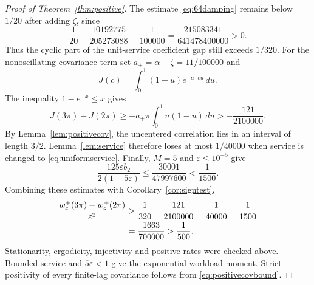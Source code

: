 \documentclass[11pt,reqno]{amsart}
\numberwithin{equation}{section}
\theoremstyle{plain}
\theoremstyle{definition}
\newcommand{\1}{\mathbf 1}
\newcommand{\eps}{\varepsilon}
\begin{document}
\begin{proof}[Proof of Theorem~\ref{thm:positive}]
The estimate \eqref{eq:64damping} remains below $1/20$ after adding $\zeta$, since
\[
 \frac1{20}-\frac{10192775}{205273088}-\frac1{100000}
 =\frac{215083341}{641478400000}>0.
\]
Thus the cyclic part of the unit-service coefficient gap still exceeds $1/320$. For the nonoscillating covariance term set $a_+=\alpha+\zeta=11/100000$ and
\[
 J(c)=\int_0^1(1-u)e^{-a_+cu}\,du.
\]
The inequality $1-e^{-x}\le x$ gives
\[
 J(3\pi)-J(2\pi)\ge-a_+\pi\int_0^1u(1-u)\,du
 >-\frac{121}{2100000}.
\]
By Lemma~\ref{lem:positivecov}, the uncentered correlation lies in an interval of length $3/2$. Lemma~\ref{lem:service} therefore loses at most $1/40000$ when service is changed to \eqref{eq:uniformservice}. Finally, $M=5$ and $\eps\le10^{-5}$ give
\[
 \frac{125\eps b_2}{2(1-5\eps)}
 \le\frac{30001}{47997600}<\frac1{1500}.
\]
Combining these estimates with Corollary~\ref{cor:signtest},
\begin{align}\label{eq:positivemargin}
 \frac{w^+_\eps(3\pi)-w^+_\eps(2\pi)}{\eps^2}
 &>\frac1{320}-\frac{121}{2100000}-\frac1{40000}-\frac1{1500}\notag\\
 &=\frac{1663}{700000}>\frac1{500}.
\end{align}
Stationarity, ergodicity, injectivity and positive rates were checked above. Bounded service and $5\eps<1$ give the exponential workload moment. Strict positivity of every finite-lag covariance follows from \eqref{eq:positivecovbound}.
\end{proof}
\end{document}
